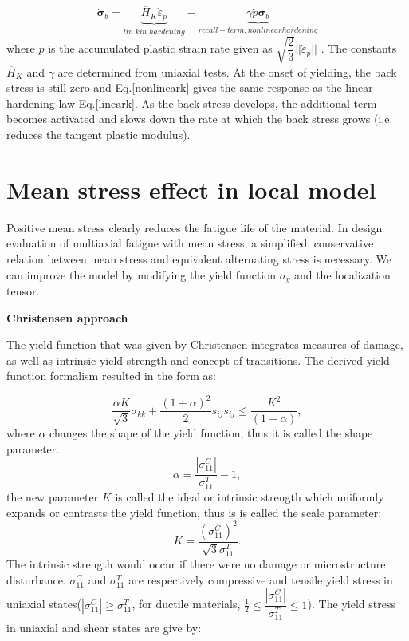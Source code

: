 \begin{equation}
\dot{\bm{\sigma}}_b=\underbrace{\overline{H}_K \dot{\varepsilon}_p}_{lin. kin. hardening} -\underbrace{\gamma\dot{p}\bm{\sigma}_b}_{recall - term, nonlinear hardening}
\label{nonlineark}
\end{equation}
where
$\dot{p}$ is the accumulated plastic strain rate given as $\sqrt{\dfrac{2}{3}}||\dot{\varepsilon}_p||$ . The constants
$\overline{H}_K$
and
$\gamma$
are determined from uniaxial tests.
At the onset of yielding, the
back stress is still zero and Eq.\eqref{nonlineark} gives the same response as the linear hardening
law Eq.\eqref{lineark}. As the back stress develops, the additional term becomes activated and
slows down the rate at which the back stress grows (i.e. reduces the tangent plastic
modulus).

\section{Mean stress effect in local model}
\label{sec:5.3}
Positive mean stress clearly reduces the fatigue life of the material. In design evaluation of multiaxial fatigue with mean stress, a simplified, conservative relation between mean stress and equivalent alternating stress is necessary. We can improve the model by modifying the yield function $\sigma_y$ and the localization tensor.

\textbf{Christensen approach}

The yield function that was given by Christensen\cite{christensen2000yield} integrates measures of damage, as well as intrinsic yield strength and concept of transitions. The derived yield function formalism resulted in the form as:

\begin{equation}
\frac{\alpha K}{\sqrt{3}}\sigma_{kk}+\frac{(1+\alpha)^2}{2}s_{ij}s_{ij}\leqslant\frac{K^2}{(1+\alpha)},
\label{eq:yieldfunc}
\end{equation}
where $\alpha$ changes the shape of the yield function, thus it is called the shape parameter. 
$$\alpha=\frac{\left| \sigma_{11}^C\right| }{\sigma_{11}^T}-1,$$
the new parameter $K$ is called the ideal or intrinsic strength which uniformly expands or contrasts the yield function, thus is is called the scale parameter:
$$K=\frac{(\sigma_{11}^C)^2}{\sqrt{3}\sigma_{11}^T}.$$
The intrinsic strength would occur if there were no damage or microstructure disturbance. 
$\sigma_{11}^C$ and $\sigma_{11}^T$ are respectively compressive and tensile yield stress in uniaxial states($\left| \sigma_{11}^C\right| \geqslant\sigma_{11}^T$, for ductile materials, $\frac{1}{2}\leqslant\dfrac{\left| \sigma_{11}^C\right| }{\sigma_{11}^T}\leqslant 1$). The yield stress in uniaxial and shear states are give by:

